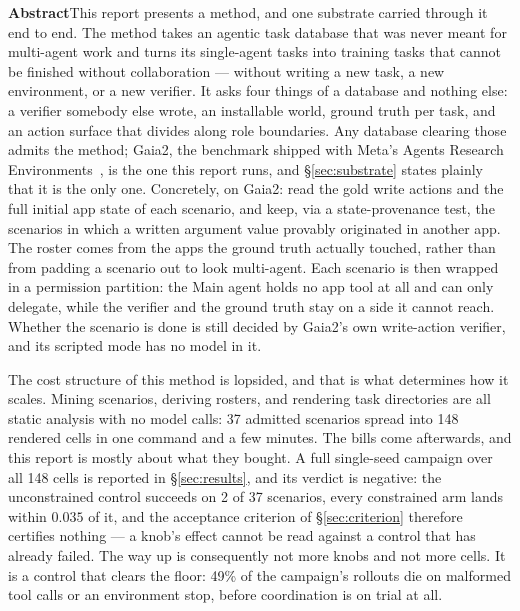 \documentclass[11pt,a4paper]{article}
\begin{document}
\vspace{0.45cm}
\noindent\begin{minipage}{0.9\textwidth}
\setlength{\parindent}{0pt}
{\bfseries Abstract}\hspace{0.6em}This report presents a method, and one substrate carried through it end to end. The method takes an agentic task database that was never meant for multi-agent work and turns its single-agent tasks into training tasks that cannot be finished without collaboration --- without writing a new task, a new environment, or a new verifier. It asks four things of a database and nothing else: a verifier somebody else wrote, an installable world, ground truth per task, and an action surface that divides along role boundaries. Any database clearing those admits the method; Gaia2, the benchmark shipped with Meta's Agents Research Environments~\cite{meta2025are}, is the one this report runs, and \S\ref{sec:substrate} states plainly that it is the only one. Concretely, on Gaia2: read the gold write actions and the full initial app state of each scenario, and keep, via a state-provenance test, the scenarios in which a written argument value provably originated in another app. The roster comes from the apps the ground truth actually touched, rather than from padding a scenario out to look multi-agent. Each scenario is then wrapped in a permission partition: the Main agent holds no app tool at all and can only delegate, while the verifier and the ground truth stay on a side it cannot reach. Whether the scenario is done is still decided by Gaia2's own write-action verifier, and its scripted mode has no model in it.

\vspace{0.5em}
The cost structure of this method is lopsided, and that is what determines how it scales. Mining scenarios, deriving rosters, and rendering task directories are all static analysis with no model calls: 37 admitted scenarios spread into 148 rendered cells in one command and a few minutes. The bills come afterwards, and this report is mostly about what they bought. A full single-seed campaign over all 148 cells is reported in \S\ref{sec:results}, and its verdict is negative: the unconstrained control succeeds on 2 of 37 scenarios, every constrained arm lands within $0.035$ of it, and the acceptance criterion of \S\ref{sec:criterion} therefore certifies nothing --- a knob's effect cannot be read against a control that has already failed. The way up is consequently not more knobs and not more cells. It is a control that clears the floor: 49\% of the campaign's rollouts die on malformed tool calls or an environment stop, before coordination is on trial at all.
\end{minipage}
\end{document}
